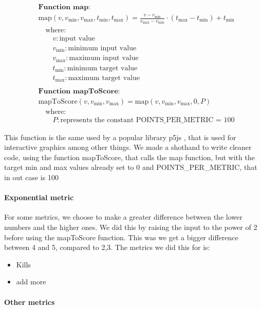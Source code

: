 \begin{align*}
& \textbf{Function map:} \\
& \text{map}(v, v_{\text{min}}, v_{\text{max}}, t_{\text{min}}, t_{\text{max}}) = \frac{v - v_{\text{min}}}{v_{\text{max}} - v_{\text{min}}} \cdot (t_{\text{max}} - t_{\text{min}}) + t_{\text{min}} \\
& \quad \text{where:}\\
& \quad \quad v: \text{input value}\\
& \quad \quad v_{\text{min}}: \text{minimum input value}\\
& \quad \quad v_{\text{max}}: \text{maximum input value}\\
& \quad \quad t_{\text{min}}: \text{minimum target value}\\
& \quad \quad t_{\text{max}}: \text{maximum target value}\\ \\
& \textbf{Function mapToScore:} \\
& \text{mapToScore}(v, v_{\text{min}}, v_{\text{max}}) = \text{map}(v, v_{\text{min}}, v_{\text{max}}, 0, P) \\
& \quad \text{where:}\\
& \quad \quad P:  \text{represents the constant POINTS\_PER\_METRIC = 100}
\end{align*}

This function is the same used by a popular library p5js \cite{p5jsMap}, that is used for interactive graphics among other things. We made a shothand to write cleaner code, using the function mapToScore, that calls the map function, but with the target min and max values already set to 0 and POINTS\_PER\_METRIC, that in out case is 100


\paragraph{Exponential metric}
For some metrics, we choose to make a greater difference between the lower numbers and the higher ones. We did this by raising the input to the power of 2 before using the mapToScore function. This was we get a bigger difference between 4 and 5, compared to 2,3. The metrics we did this for is:
\begin{itemize}
    \item Kills
    \item add more 
\end{itemize}



\paragraph{Other metrics}

